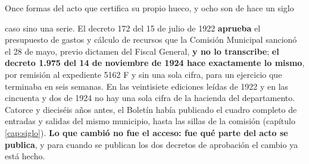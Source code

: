 \begin{ficha}{Once formas del acto que certifica su propio hueco, y ocho son de hace un siglo}
\begin{itemize}[leftmargin=*,nosep]
{caso sino una serie.} El decreto 172 del
15 de julio de 1922 \textbf{aprueba} el presupuesto de gastos y cálculo de recursos que la
Comisión Municipal sancionó el 28 de mayo, previo dictamen del Fiscal General, \textbf{y no lo
transcribe}; \textbf{el decreto 1.975 del 14 de noviembre de 1924 hace exactamente lo mismo},
por remisión al expediente 5162 F y sin una sola cifra, para un ejercicio que terminaba en seis
semanas. En las veintisiete ediciones leídas de 1922 y en las cincuenta y dos de 1924 no hay una
sola cifra de la hacienda del departamento. Catorce y dieciséis años antes, el Boletín había
publicado el cuadro completo de entradas y
salidas del mismo municipio, hasta las sillas de la comisión (capítulo \ref{cap:siglo}).
\textbf{Lo que cambió no fue el acceso: fue qué parte del acto se publica}, y para cuando se
publican los dos decretos de aprobación el cambio ya está hecho.


\end{itemize}
\end{ficha}
